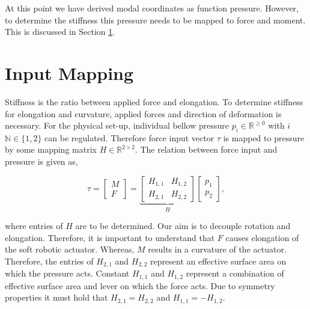 At this point we have derived modal coordinates as function pressure. However, to determine the stiffness this pressure needs to be mapped to force and moment. This is discussed in Section \ref{sec3:InputMapping}.






\section{Input Mapping}
\label{sec3:InputMapping}

Stiffness is the ratio between applied force and elongation. To determine stiffness for elongation and curvature, applied forces and direction of deformation is necessary. For the physical set-up, individual bellow pressure $p_i \in \mathbb{R}^{\geq 0}$ with $i$ $\mathbb{N} \in \{1,2\}$ can be regulated. Therefore force input vector $\tau$ is mapped to pressure by some mapping matrix $H \in \mathbb{R}^{2 \times 2}$. The relation between force input and pressure is given as, 

\begin{equation}
   \tau =   \begin{bmatrix} M \\ F \end{bmatrix}     = \underbrace{\begin{bmatrix}  H_{1,1} & H_{1,2} \\ H_{2,1} & H_{2,2} \end{bmatrix}}_{H}         \begin{bmatrix}  p_1 \\ p_2 \end{bmatrix}, \label{eq3:H}
\end{equation}

where entries of $H$ are to be determined. Our aim is to decouple rotation and elongation. Therefore, it is important to understand that $F$ causes elongation of the soft robotic actuator. Whereas, $M$ results in a curvature of the actuator. Therefore, the entries of $H_{2,1}$ and $H_{2,2}$ represent an effective surface area on which the pressure acts. Constant $H_{1,1}$ and $H_{1,2}$ represent a combination of effective surface area and lever on which the force acts. Due to symmetry properties it must hold that $H_{2,1} = H_{2,2}$ and $H_{1,1} = -H_{1,2}$.

